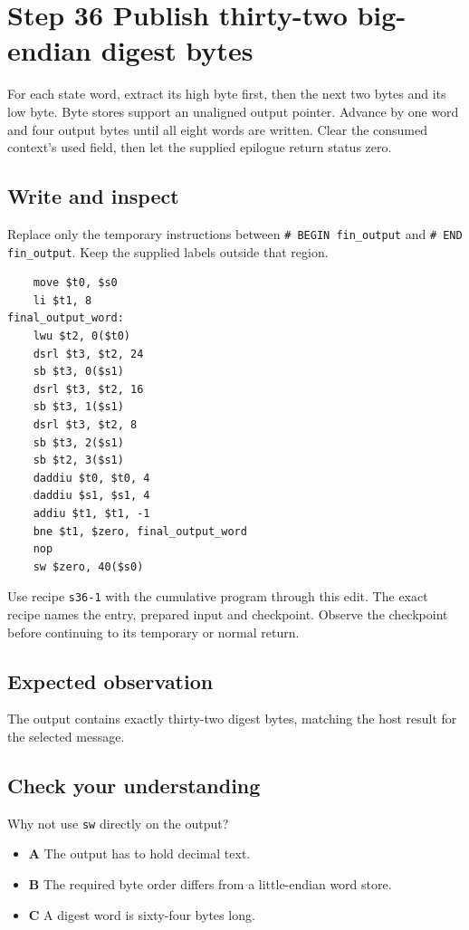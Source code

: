 \section{Step 36 Publish thirty-two big-endian digest bytes}\label{sha-s36}

For each state word, extract its high byte first, then the next two bytes and its low byte. Byte stores support an unaligned output pointer. Advance by one word and four output bytes until all eight words are written. Clear the consumed context's used field, then let the supplied epilogue return status zero.

\subsection{Write and inspect}
Replace only the temporary instructions between \texttt{\# BEGIN fin\_output} and \texttt{\# END fin\_output}. Keep the supplied labels outside that region.

\begin{verbatim}
    move $t0, $s0
    li $t1, 8
final_output_word:
    lwu $t2, 0($t0)
    dsrl $t3, $t2, 24
    sb $t3, 0($s1)
    dsrl $t3, $t2, 16
    sb $t3, 1($s1)
    dsrl $t3, $t2, 8
    sb $t3, 2($s1)
    sb $t2, 3($s1)
    daddiu $t0, $t0, 4
    daddiu $s1, $s1, 4
    addiu $t1, $t1, -1
    bne $t1, $zero, final_output_word
    nop
    sw $zero, 40($s0)
\end{verbatim}

Use recipe \texttt{s36-1} with the cumulative program through this edit. The exact recipe names the entry, prepared input and checkpoint. Observe the checkpoint before continuing to its temporary or normal return.

\subsection{Expected observation}
The output contains exactly thirty-two digest bytes, matching the host result for the selected message.

\subsection{Check your understanding}
Why not use \texttt{sw} directly on the output?

\begin{itemize}
  \item \textbf{A} The output has to hold decimal text.
  \item \textbf{B} The required byte order differs from a little-endian word store.
  \item \textbf{C} A digest word is sixty-four bytes long.
\end{itemize}
